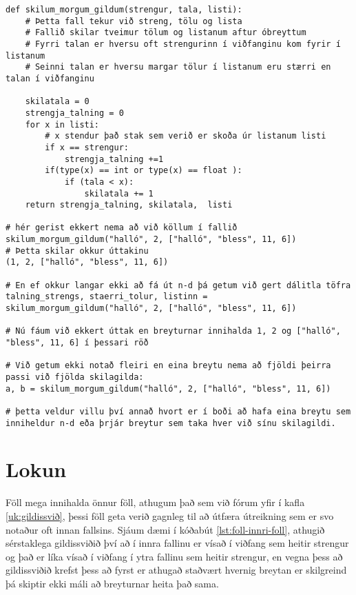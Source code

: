 \begin{lstlisting}[caption=Hvernig á að skila mörgum gildum, label=lst:foll-ndir-skilagildi]
def skilum_morgum_gildum(strengur, tala, listi):
	# Þetta fall tekur við streng, tölu og lista
	# Fallið skilar tveimur tölum og listanum aftur óbreyttum
	# Fyrri talan er hversu oft strengurinn í viðfanginu kom fyrir í listanum
	# Seinni talan er hversu margar tölur í listanum eru stærri en talan í viðfanginu
	
	skilatala = 0
	strengja_talning = 0
	for x in listi:
		# x stendur það stak sem verið er skoða úr listanum listi
		if x == strengur:
			strengja_talning +=1
		if(type(x) == int or type(x) == float ):
			if (tala < x):
				skilatala += 1
	return strengja_talning, skilatala,  listi
	
# hér gerist ekkert nema að við köllum í fallið
skilum_morgum_gildum("halló", 2, ["halló", "bless", 11, 6])
# Þetta skilar okkur úttakinu
(1, 2, ["halló", "bless", 11, 6])

# En ef okkur langar ekki að fá út n-d þá getum við gert dálitla töfra 
talning_strengs, staerri_tolur, listinn = skilum_morgum_gildum("halló", 2, ["halló", "bless", 11, 6])

# Nú fáum við ekkert úttak en breyturnar innihalda 1, 2 og ["halló", "bless", 11, 6] í þessari röð

# Við getum ekki notað fleiri en eina breytu nema að fjöldi þeirra passi við fjölda skilagilda:
a, b = skilum_morgum_gildum("halló", 2, ["halló", "bless", 11, 6])

# þetta veldur villu því annað hvort er í boði að hafa eina breytu sem inniheldur n-d eða þrjár breytur sem taka hver við sínu skilagildi.
\end{lstlisting}

\section{Lokun}

Föll mega innihalda önnur föll, athugum það sem við fórum yfir í kafla \ref{uk:gildissvið}, þessi föll geta verið gagnleg til að útfæra útreikning sem er svo notaður oft innan fallsins.
Sjáum dæmi í kóðabút \ref{lst:foll-innri-foll}, athugið sérstaklega gildissviðið því að í innra fallinu er vísað í viðfang sem heitir strengur og það er líka vísað í viðfang í ytra fallinu sem heitir strengur, en vegna þess að gildissviðið krefst þess að fyrst er athugað staðvært hvernig breytan er skilgreind þá skiptir ekki máli að breyturnar heita það sama.

